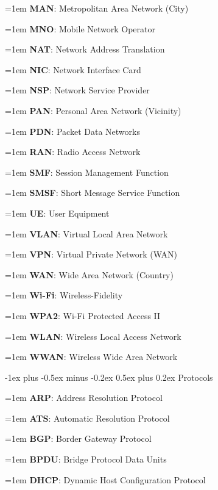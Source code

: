 \documentclass[letterpaper,8pt]{extarticle}
\makeatletter
\newcommand{\definition}[2]{
  \hangindent=1em
  \textbf{#1}: #2%
}
\renewcommand{\subsection}{\@startsection{subsection}{2}{0mm}%
  {-1ex plus -0.5ex minus -0.2ex}%
  {0.5ex plus 0.2ex}%
{\color{h2}\normalfont\fontsize{6}{6}\selectfont\bfseries}}
\makeatother
\begin{document}
\begin{multicols*}{5}
\begin{multicols*}{2}
    \definition{MAN}{Metropolitan Area Network (City)}
    
    \definition{MNO}{Mobile Network Operator}
    
    \definition{NAT}{Network Address Translation}
    
    \definition{NIC}{Network Interface Card}
    
    \definition{NSP}{Network Service Provider}
    
    \definition{PAN}{Personal Area Network (Vicinity)}
    
    \definition{PDN}{Packet Data Networks}
    
    \definition{RAN}{Radio Access Network}
    
    \definition{SMF}{Session Management Function}
    
    \definition{SMSF}{Short Message Service Function}
    
    \definition{UE}{User Equipment}
    
    \definition{VLAN}{Virtual Local Area Network}
    
    \definition{VPN}{Virtual Private Network (WAN)}
    
    \definition{WAN}{Wide Area Network (Country)}
    
    \definition{Wi-Fi}{Wireless-Fidelity}
    
    \definition{WPA2}{Wi-Fi Protected Access II}
    
    \definition{WLAN}{Wireless Local Access Network}
    
    \definition{WWAN}{Wireless Wide Area Network}
    
  \end{multicols*}
  
  \subsection{Protocols}
  
  \begin{multicols*}{2}
    
    \definition{ARP}{Address Resolution Protocol}
    
    \definition{ATS}{Automatic Resolution Protocol}
    
    \definition{BGP}{Border Gateway Protocol}
    
    \definition{BPDU}{Bridge Protocol Data Units}
    
    \definition{DHCP}{Dynamic Host Configuration Protocol}
    

\end{multicols*}
\end{multicols*}
\end{document}
